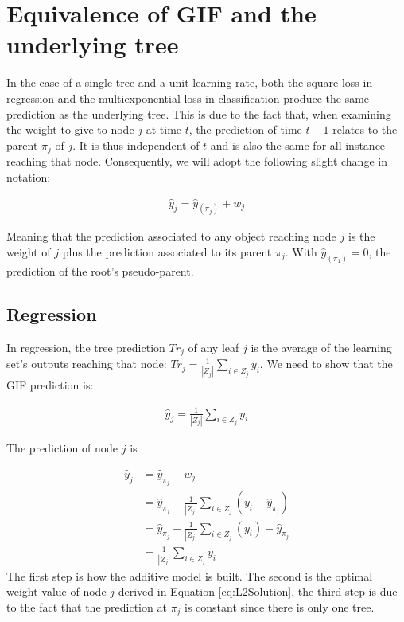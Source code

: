 \documentclass{article}
\begin{document}
\appendix
\section{Equivalence of GIF and the underlying tree}\label{app:Equiv}
In the case of a single tree and a unit learning rate, both the square loss in 
regression and the multiexponential loss in classification produce the same 
prediction as the underlying tree. 
This is due to the fact that, when examining the weight to give to node $j$ at 
time $t$, the prediction of time $t-1$ relates to the parent $\pi_j$ of $j$. It 
is thus independent of $t$ and is also the same for all instance reaching that 
node. Consequently, we will adopt the following slight change in notation:

\begin{align}
\hat{y}_j = \hat{y}_{(\pi_j)} + w_j
\end{align}

Meaning that the prediction associated to any object reaching node $j$ is the 
weight of $j$ plus the prediction associated to its parent $\pi_j$. With 
$\hat{y}_{(\pi_1)} = 0$, the prediction of the root's pseudo-parent.

\subsection{Regression}
In regression, the tree prediction $Tr_j$ of any leaf $j$ is the average of the 
learning set's outputs reaching that node: $Tr_j = \frac{1}{|Z_j|}\sum_{i \in 
Z_j} y_i$. We need to show that the GIF prediction is:

\begin{align}\label{eq:EquivL2Cond}
\hat{y}_{j} = \frac{1}{|Z_j|}\sum_{i \in Z_j} y_i
\end{align}


The prediction of node $j$ is

\begin{align}\label{eq:EquivL2Solution}
\hat{y}_j &= \hat{y}_{\pi_j} + w_j \\
&= \hat{y}_{\pi_j} +  \frac{1}{|Z_j|} \sum_{i \in Z_j} \left(y_i - 
\hat{y}_{\pi_j}\right) \\
&= \hat{y}_{\pi_j} + \frac{1}{|Z_j|} \sum_{i \in Z_j} \left( y_i \right) - 
\hat{y}_{\pi_j} \\
&= \frac{1}{|Z_j|} \sum_{i \in Z_j}  y_i 
\end{align}
The first step is how the additive model is built. The second is the optimal 
weight value of node $j$ derived in Equation \ref{eq:L2Solution}, the third 
step is due to the fact that the prediction at $\pi_j$ is constant since there 
is only one tree.
\end{document}
